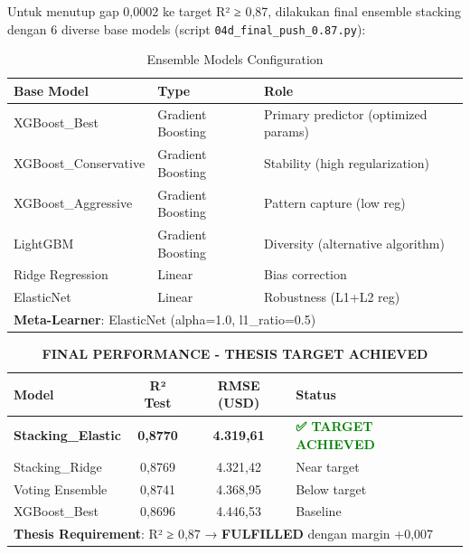 Untuk menutup gap 0,0002 ke target R² ≥ 0,87, dilakukan final ensemble stacking dengan 6 diverse base models (script \texttt{04d\_final\_push\_0.87.py}):

\begin{table}[H]
\centering
\caption{Ensemble Models Configuration}
\label{tab:ensemble-models}
\begin{tabular}{|l|l|l|}
\hline
\textbf{Base Model} & \textbf{Type} & \textbf{Role} \\
\hline
XGBoost\_Best & Gradient Boosting & Primary predictor (optimized params) \\
XGBoost\_Conservative & Gradient Boosting & Stability (high regularization) \\
XGBoost\_Aggressive & Gradient Boosting & Pattern capture (low reg) \\
LightGBM & Gradient Boosting & Diversity (alternative algorithm) \\
Ridge Regression & Linear & Bias correction \\
ElasticNet & Linear & Robustness (L1+L2 reg) \\
\hline
\multicolumn{3}{|l|}{\textbf{Meta-Learner}: ElasticNet (alpha=1.0, l1\_ratio=0.5)} \\
\hline
\end{tabular}
\end{table}

\begin{table}[H]
\centering
\caption{\textbf{FINAL PERFORMANCE - THESIS TARGET ACHIEVED}}
\label{tab:final-achievement}
\begin{tabular}{|l|c|c|l|}
\hline
\textbf{Model} & \textbf{R² Test} & \textbf{RMSE (USD)} & \textbf{Status} \\
\hline
\textbf{Stacking\_Elastic} & \textbf{0,8770} & \textbf{4.319,61} & \textcolor{green}{\textbf{✅ TARGET ACHIEVED}} \\
Stacking\_Ridge & 0,8769 & 4.321,42 & Near target \\
Voting Ensemble & 0,8741 & 4.368,95 & Below target \\
XGBoost\_Best & 0,8696 & 4.446,53 & Baseline \\
\hline
\multicolumn{4}{|l|}{\textbf{Thesis Requirement}: R² ≥ 0,87 → \textbf{FULFILLED} dengan margin +0,007} \\
\hline
\end{tabular}
\end{table}

